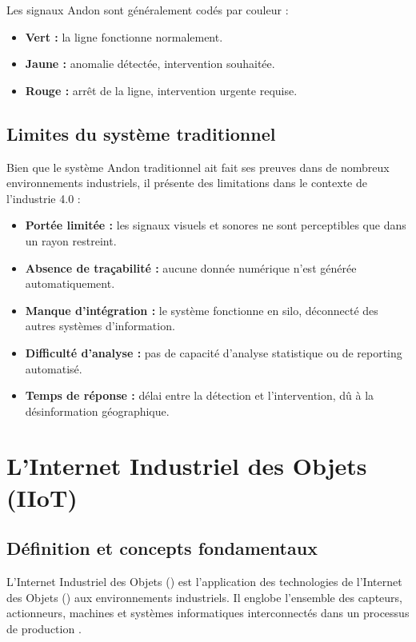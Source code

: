Les signaux Andon sont g\'en\'eralement cod\'es par couleur :
\begin{itemize}
    \item \textbf{Vert :} la ligne fonctionne normalement.
    \item \textbf{Jaune :} anomalie d\'etect\'ee, intervention souhait\'ee.
    \item \textbf{Rouge :} arr\^et de la ligne, intervention urgente requise.
\end{itemize}

\subsection{Limites du syst\`eme traditionnel}

Bien que le syst\`eme Andon traditionnel ait fait ses preuves dans de nombreux environnements industriels, il pr\'esente des limitations dans le contexte de l'industrie 4.0 :

\begin{itemize}
    \item \textbf{Port\'ee limit\'ee :} les signaux visuels et sonores ne sont perceptibles que dans un rayon restreint.
    \item \textbf{Absence de tra\c{c}abilit\'e :} aucune donn\'ee num\'erique n'est g\'en\'er\'ee automatiquement.
    \item \textbf{Manque d'int\'egration :} le syst\`eme fonctionne en silo, d\'econnect\'e des autres syst\`emes d'information.
    \item \textbf{Difficult\'e d'analyse :} pas de capacit\'e d'analyse statistique ou de reporting automatis\'e.
    \item \textbf{Temps de r\'eponse :} d\'elai entre la d\'etection et l'intervention, d\^u \`a la d\'esinformation g\'eographique.
\end{itemize}

\section{L'Internet Industriel des Objets (IIoT)}

\subsection{D\'efinition et concepts fondamentaux}

L'Internet Industriel des Objets (\iiot) est l'application des technologies de l'Internet des Objets (\iot) aux environnements industriels. Il englobe l'ensemble des capteurs, actionneurs, machines et syst\`emes informatiques interconnect\'es dans un processus de production \cite{xu2018industry}.

